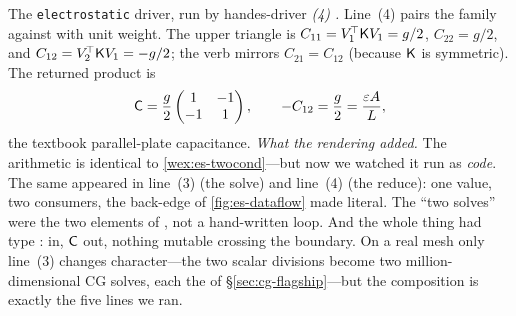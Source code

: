 \begin{workedexample}{The \texttt{electrostatic} driver, run by hand}{es-driver}
\emph{(4) .} Line~(4) pairs the
family against  with unit weight. The upper triangle is
$C_{11}=V_1^{\!\top}\mathsf{K} V_1=g/2$, $C_{22}=g/2$, and
$C_{12}=V_2^{\!\top}\mathsf{K} V_1=-g/2$; the verb mirrors $C_{21}=C_{12}$ (because $\mathsf{K}$
is symmetric). The returned product is
\[
  \mathsf{C}=\frac{g}{2}\begin{pmatrix}1&-1\\-1&1\end{pmatrix},
  \qquad -C_{12}=\frac{g}{2}=\frac{\varepsilon A}{L},
\]
the textbook parallel-plate capacitance. \tcblower
\emph{What the rendering added.} The arithmetic is identical to
\cref{wex:es-twocond}---but now we watched it run as \emph{code}. The same 
appeared in line~(3) (the solve) and line~(4) (the reduce): one value, two
consumers, the back-edge of \cref{fig:es-dataflow} made literal. The ``two solves''
were the two elements of , not a hand-written loop. And the whole thing had
type :  in, $\mathsf{C}$ out,
nothing mutable crossing the boundary. On a real mesh only line~(3) changes
character---the two scalar divisions become two million-dimensional CG solves, each
the  of \S\ref{sec:cg-flagship}---but the composition is exactly the
five lines we ran.
\end{workedexample}

